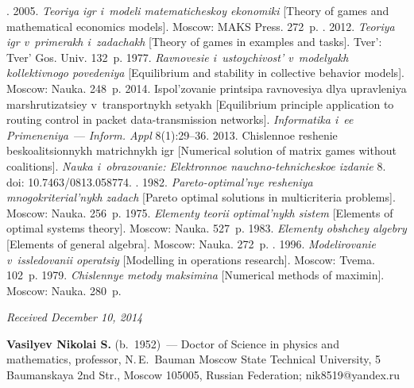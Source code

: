 \begin{multicols}{2}
{{\begin{thebibliography}{99}
. 2005. \textit{Teoriya igr i~modeli
matematicheskoy ekonomiki} [Theory of games and mathematical economics models].
Moscow: MAKS Press. 272~p.
. 2012. \textit{Teoriya igr v~primerakh
i~zadachakh} [Theory of games in examples and tasks]. Tver': Tver' Gos. Univ. 132~p.
 1977. \textit{Ravnovesie i~ustoychivost' v~modelyakh
kollektivnogo povedeniya} [Equilibrium and stability in collective behavior models].
Moscow: Nauka. 248~p.
 2014. Ispol'zovanie printsipa ravnovesiya dlya upravleniya
marshrutizatsiey v~transportnykh setyakh [Equilibrium principle application to routing
control in packet data-transmission networks]. \textit{Informatika i~ee
Primeneniya}~--- \textit{Inform. Appl} 8(1):29--36.
 2013. Chislennoe reshenie bes\-koa\-li\-tsi\-on\-nykh matrichnykh igr
[Numerical solution of matrix games without coalitions]. \textit{Nauka i~obrazovanie:
Elektronnoe nauchno-tehnicheskoe izdanie} 8. doi: 10.7463/0813.058774.
. 1982. \textit{Pareto-optimal'nye
resheniya mnogokriterial'nykh zadach} [Pareto optimal solutions in multicriteria
problems]. Moscow: Nauka. 256~p.
 1975. \textit{Elementy teorii optimal'nykh sistem} [Elements of
optimal systems theory]. Moscow: Nauka. 527~p.
 1983. \textit{Elementy obshchey algebry} [Elements of
general algebra]. Moscow: Nauka. 272~p.
. 1996. \textit{Modelirovanie
v~issledovanii operatsiy} [Modelling in operations research]. Moscow: Tvema. 102~p.
 1979. \textit{Chislennye metody maksimina} [Numerical
methods of maximin]. Moscow: Nauka. 280~p.

\end{thebibliography}

 }
 }

\end{multicols}

\vspace*{-3pt}

\hfill{\small\textit{Received December 10, 2014}}



     \Contrl

     \noindent
     \textbf{Vasilyev Nikolai S.} (b.\ 1952)~---
      Doctor of Science in physics and mathematics, professor,
N.\,E.~Bauman Moscow State Technical University, 5 Baumanskaya 2nd Str.,
Moscow 105005, Russian Federation; nik8519@yandex.ru

\label{end\stat}


\renewcommand{\bibname}{\protect\rm Литература}